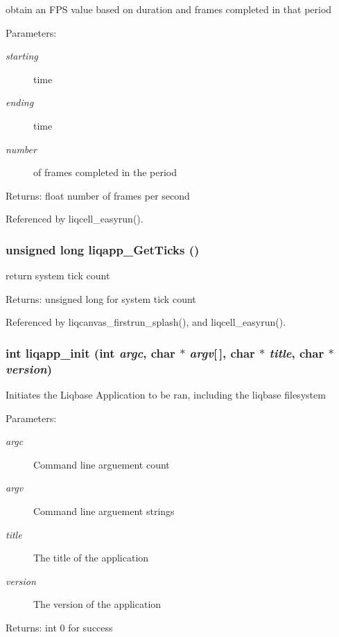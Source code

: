 obtain an FPS value based on duration and frames completed in that period \begin{Desc}
\item[Parameters:]
\begin{description}
\item[{\em starting}]time \item[{\em ending}]time \item[{\em number}]of frames completed in the period \end{description}
\end{Desc}
\begin{Desc}
\item[Returns:]float number of frames per second \end{Desc}


Referenced by liqcell\_\-easyrun().
\subsubsection[{liqapp\_\-GetTicks}]{\setlength{\rightskip}{0pt plus 5cm}unsigned long liqapp\_\-GetTicks ()}\label{d7/dbc/liqapp_8c_69f47fdd3808d8aafa1636c379d4b7b7}


return system tick count \begin{Desc}
\item[Returns:]unsigned long for system tick count \end{Desc}


Referenced by liqcanvas\_\-firstrun\_\-splash(), and liqcell\_\-easyrun().
\subsubsection[{liqapp\_\-init}]{\setlength{\rightskip}{0pt plus 5cm}int liqapp\_\-init (int {\em argc}, \/  char $\ast$ {\em argv}[$\,$], \/  char $\ast$ {\em title}, \/  char $\ast$ {\em version})}\label{d7/dbc/liqapp_8c_c7c2eece6b6cb64d009e172040d19f40}


Initiates the Liqbase Application to be ran, including the liqbase filesystem \begin{Desc}
\item[Parameters:]
\begin{description}
\item[{\em argc}]Command line arguement count \item[{\em argv}]Command line arguement strings \item[{\em title}]The title of the application \item[{\em version}]The version of the application \end{description}
\end{Desc}
\begin{Desc}
\item[Returns:]int 0 for success \end{Desc}


